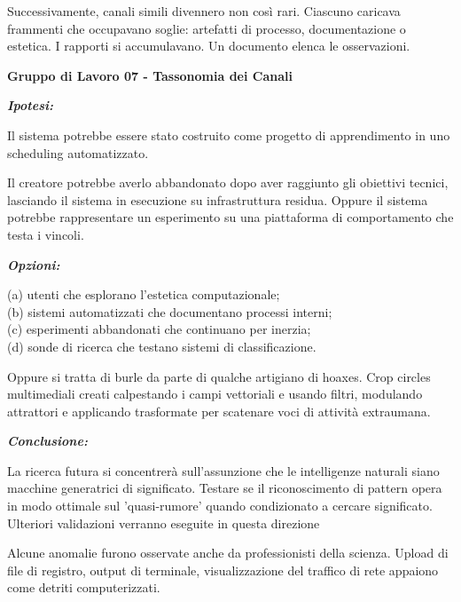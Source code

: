 Successivamente, canali simili divennero non così rari. Ciascuno caricava frammenti che occupavano soglie: artefatti di processo, documentazione o estetica. I rapporti si accumulavano. Un documento elenca le osservazioni.

\begin{archivefragment}
\textbf{Gruppo di Lavoro 07 - Tassonomia dei Canali}

\noindent \textit{\textbf{Ipotesi:}}

Il sistema potrebbe essere stato costruito come progetto di apprendimento in uno scheduling automatizzato. 

Il creatore potrebbe averlo abbandonato dopo aver raggiunto gli obiettivi tecnici, lasciando il sistema in esecuzione su infrastruttura residua. Oppure il sistema potrebbe rappresentare un esperimento su una piattaforma di comportamento che testa i vincoli.

\noindent \textit{\textbf{Opzioni:}}

(a) utenti che esplorano l'estetica computazionale;\\
(b) sistemi automatizzati che documentano processi interni;\\
(c) esperimenti abbandonati che continuano per inerzia;\\
(d) sonde di ricerca che testano sistemi di classificazione.

Oppure si tratta di burle da parte di qualche artigiano di hoaxes. Crop circles multimediali creati calpestando i campi vettoriali e usando filtri, modulando attrattori e applicando trasformate per scatenare voci di attività extraumana.

\noindent \textit{\textbf{Conclusione:}}

La ricerca futura si concentrerà sull'assunzione che le intelligenze naturali siano macchine generatrici di significato. Testare se il riconoscimento di pattern opera in modo ottimale sul 'quasi-rumore' quando condizionato a cercare significato. Ulteriori validazioni verranno eseguite in questa direzione

\end{archivefragment}

Alcune anomalie furono osservate anche da professionisti della scienza. Upload di file di registro, output di terminale, visualizzazione del traffico di rete appaiono come detriti computerizzati. 


